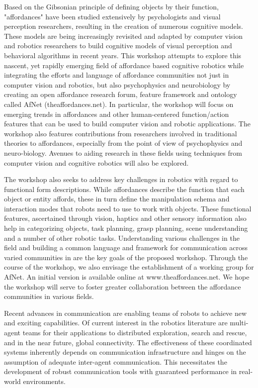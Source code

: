 \begin{spacing}{1.0}
{
Based on the Gibsonian principle of defining objects by their function, "affordances" have been studied extensively by psychologists and visual perception researchers, resulting in the creation of numerous cognitive models. These models are being increasingly revisited and adapted by computer vision and robotics researchers to build cognitive models of visual perception and behavioral algorithms in recent years. This workshop attempts to explore this nascent, yet rapidly emerging field of affordance based cognitive robotics while integrating the efforts and language of affordance communities not just in computer vision and robotics, but also psychophysics and neurobiology by creating an open affordance research forum, feature framework and ontology called AfNet (theaffordances.net). In particular, the workshop will focus on emerging trends in affordances and other human-centered function/action features that can be used to build computer vision and robotic applications. The workshop also features contributions from researchers involved in traditional theories to affordances, especially from the point of view of psychophysics and neuro-biology. Avenues to aiding research in these fields using techniques from computer vision and cognitive robotics will also be explored.

The workshop also seeks to address key challenges in robotics with regard to functional form descriptions. While affordances describe the function that each object or entity affords, these in turn define the manipulation schema and interaction modes that robots need to use to work with objects. These functional features, ascertained through vision, haptics and other sensory information also help in categorizing objects, task planning, grasp planning, scene understanding and a number of other robotic tasks. Understanding various challenges in the field and building a common language and framework for communication across varied communities in are the key goals of the proposed workshop. Through the course of the workshop, we also envisage the establishment of a working group for AfNet. An initial version is available online at www.theaffordances.net. We hope the workshop will serve to foster greater collaboration between the affordance communities in various fields.
}


{
Recent advances in communication are enabling teams of robots to achieve new and exciting capabilities. Of current interest in the robotics literature are multi-agent teams for their applications to distributed exploration, search and rescue, and in the near future, global connectivity. The effectiveness of these coordinated systems inherently depends on communication infrastructure and hinges on the assumption of adequate inter-agent communication. This necessitates the development of robust communication tools with guaranteed performance in real-world environments.

}
\end{spacing}
